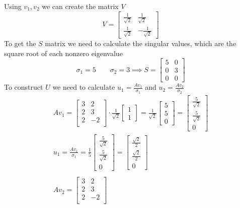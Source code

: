 \documentclass[a4paper,fleqn,12pt]{article}
\begin{document}
Using $v_1, v_2$ we can create the matrix $V$
$$
V = 
\begin{bmatrix} 
\frac{1}{\sqrt{2}} & \frac{1}{\sqrt{2}} \\
\frac{1}{\sqrt{2}} & -\frac{1}{\sqrt{2}}
\end{bmatrix}
$$
To get the $S$ matrix we need to calculate the singular values, which are the square root of each nonzero eigenvalue
$$
\sigma_1 = 5 \qquad \sigma_2 = 3 \implies
S = 
\begin{bmatrix}
5 & 0 \\
0 & 3 \\
0 & 0
\end{bmatrix}
$$
To construct $U$ we need to calculate $u_1 = \frac{Av_1}{\sigma_1}$ and $u_2 = \frac{Av_2}{\sigma_2}$
\begin{gather*}
Av_1 =
\begin{bmatrix}
3 & 2 \\
2 & 3 \\
2 & -2 \\
\end{bmatrix} \cdot 
\frac{1}{\sqrt{2}} \begin{bmatrix} 1 \\1 \end{bmatrix}  = \frac{1}{\sqrt{2}} \begin{bmatrix} 5 \\ 5 \\0 \end{bmatrix} =  \begin{bmatrix} \frac{5}{\sqrt{2}} \\ \frac{5}{\sqrt{2}} \\0 \end{bmatrix} \\
 u_1 = \frac{Av_1}{\sigma_1} = \frac{1}{5} \begin{bmatrix} \frac{5}{\sqrt{2}} \\ \frac{5}{\sqrt{2}} \\0 \end{bmatrix} = 
\begin{bmatrix} \frac{\sqrt{2}}{2}  \\ \frac{\sqrt{2}}{2}  \\0 \end{bmatrix} \\
\\
Av_2  = \begin{bmatrix}
3 & 2 \\
2 & 3 \\
2 & -2 \\

\end{bmatrix}
\end{gather*}
\end{document}
